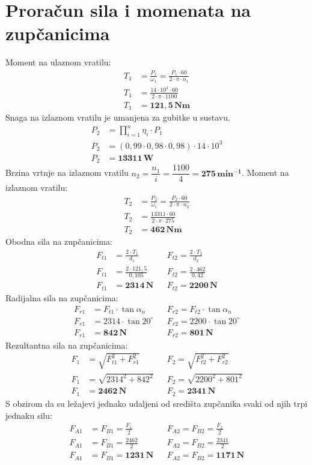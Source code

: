 \documentclass[11pt,a4paper]{report}
\begin{document}
\section{Proračun sila i momenata na zupčanicima}
Moment na ulaznom vratilu:
\begin{align*}
T_1&=\frac{P_1}{\omega_1}=\frac{P_1 \cdot 60}{2 \cdot \pi \cdot n_1}\\
T_1&=\frac{14 \cdot 10^3 \cdot 60}{2 \cdot \pi \cdot 1100}\\
T_1&=\mathbf{121,5 \, Nm}
\end{align*}
Snaga na izlaznom vratilu je umanjena za gubitke u sustavu.
\begin{align*}
P_2&=\prod_{i=1}^{n} \eta_i \cdot P_1\\
P_2&=(0,99 \cdot 0,98 \cdot 0,98) \cdot 14\cdot10^3\\
P_2&=\mathbf{13311 \, W}
\end{align*}
Brzina vrtnje na izlaznom vratilu $n_2=\dfrac{n_1}{i}=\dfrac{1100}{4}=\mathbf{275 \, min^{-1}}$.
Moment na izlaznom vratilu:
\begin{align*}
T_2&=\frac{P_2}{\omega_1}=\frac{P_2 \cdot 60}{2 \cdot \pi \cdot n_2}\\
T_2&=\frac{13311 \cdot 60}{2 \cdot \pi \cdot 275}\\
T_2&=\mathbf{462 \, Nm}
\end{align*}
Obodna sila na zupčanicima:
\begin{align*}
F_{t1}&=\frac{2 \cdot T_1}{d_1} && F_{t2}=\frac{2 \cdot T_2}{d_2}\\
F_{t1}&=\frac{2 \cdot 121,5}{0,105} && F_{t2}=\frac{2 \cdot 462}{0,42}\\
F_{t1}&=\mathbf{2314 \, N} && F_{t2}=\mathbf{2200 \, N}
\end{align*}
Radijalna sila na zupčanicima:
\begin{align*}
F_{r1}&=F_{t1} \cdot \tan \alpha_n && F_{r2}=F_{t2} \cdot \tan \alpha_n \\
F_{r1}&=2314 \cdot \tan 20^{\circ} && F_{r2}=2200 \cdot \tan 20^{\circ} \\
F_{r1}&=\mathbf{842 \, N} && F_{r2}=\mathbf{801 \, N}
\end{align*}
Rezultantna sila na zupčanicima:
\begin{align*}
F_1&=\sqrt{F_{t1}^2+F_{r1}^2} && F_2=\sqrt{F_{t2}^2+F_{r2}^2}\\
F_1&=\sqrt{2314^2+842^2} && F_2=\sqrt{2200^2+801^2}\\
F_1&=\mathbf{2462 \, N} && F_2=\mathbf{2341 \, N}
\end{align*}
S obzirom da su ležajevi jednako udaljeni od središta zupčanika svaki od njih trpi jednaku silu:
\begin{align*}
F_{A1}&=F_{B1}=\frac{F_1}{2} && F_{A2}=F_{B2}=\frac{F_2}{2}\\
F_{A1}&=F_{B1}=\frac{2462}{2} && F_{A2}=F_{B2}=\frac{2341}{2}\\
F_{A1}&=F_{B1}=\mathbf{1231 \, N} && F_{A2}=F_{B2}=\mathbf{1171 \, N}
\end{align*}
\end{document}
